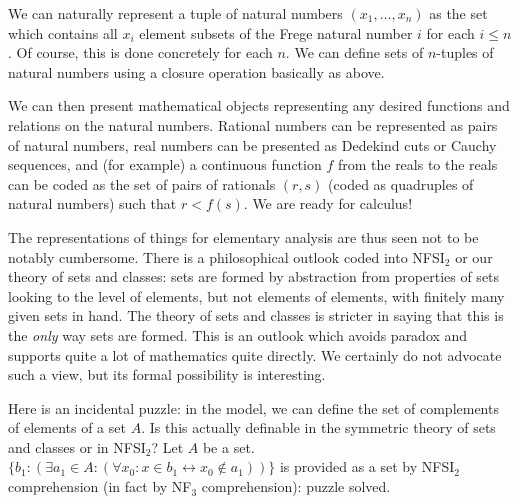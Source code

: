 \documentclass{article}
\begin{document}
\begin{description}
We can naturally represent a tuple of natural numbers $(x_1,\ldots,x_n)$ as the set which contains all $x_i$ element subsets of the Frege natural number $i$ for each $i \leq n$.  Of course, this is done concretely for each $n$.  We can define sets of $n$-tuples of natural numbers using a closure operation basically as above.

We can then present mathematical objects representing any desired functions and relations on the natural numbers.  Rational numbers can be represented as pairs of natural numbers, real numbers can be presented as Dedekind cuts or Cauchy sequences,  and (for example)
a continuous function $f$ from the reals to the reals can be coded as the set of pairs of rationals $(r,s)$ (coded as quadruples of natural numbers) such that $r < f(s)$.  We are ready for calculus!

The representations of things for elementary analysis are thus seen not to be notably cumbersome.  There is a philosophical outlook coded into NFSI$_2$ or our theory of sets and classes:  sets are formed by abstraction from properties of sets
looking to the level of elements, but not elements of elements, with finitely many given sets in hand.  The theory of sets and classes is stricter in saying that this is the {\em only\/} way sets are formed.  This is an outlook which avoids paradox and supports quite a lot of mathematics quite directly.  We certainly do not advocate such a view, but its formal possibility is interesting.

Here is an incidental puzzle:  in the model, we can define the set of complements of elements of a set $A$.  Is this actually definable in the symmetric theory of sets and classes or in NFSI$_2$?  Let $A$ be a set.  $\{b_1 : (\exists a_1 \in A:(\forall x_0:  x \in b_1 \leftrightarrow x_0 \not\in a_1))\}$ is provided as a set by NFSI$_2$ comprehension (in fact by NF$_3$ comprehension):  puzzle solved.





















\end{description}
\end{document}
